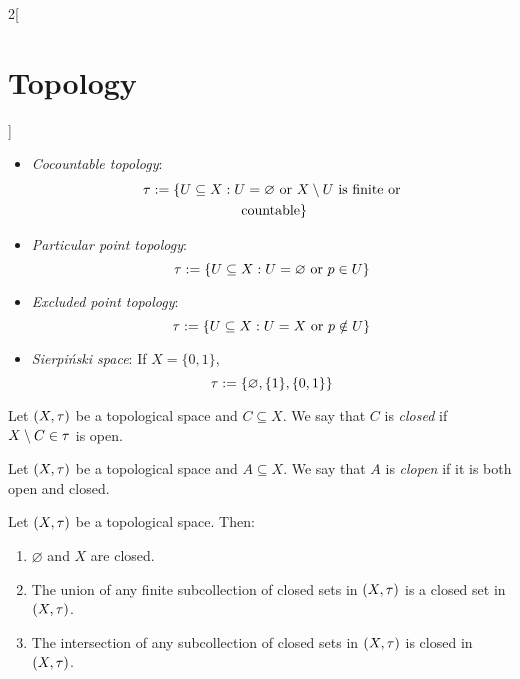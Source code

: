 \documentclass[../../../main.tex]{subfiles}
\begin{document}
\begin{multicols}{2}[\section{Topology}]
\begin{prop}
\begin{itemize}
      \item \textit{Cocountable topology}:
            \begin{multline*}
              \tau:=\{U\subseteq X:U=\varnothing\text{ or }X\setminus U\text{ is finite or}\\\text{ countable}\}
            \end{multline*}
      \item \textit{Particular point topology}: $$\tau:=\{U\subseteq X:U=\varnothing\text{ or }p\in U\}$$
      \item \textit{Excluded point topology}: $$\tau:=\{U\subseteq X:U=X\text{ or }p\notin U\}$$
      \item \textit{Sierpiński space}: If $X=\{0,1\}$, $$\tau:=\{\varnothing,\{1\},\{0,1\}\}$$
    \end{itemize}
  \end{prop}
  \begin{definition}
    Let $(X,\tau)$ be a topological space and $C\subseteq X$. We say that $C$ is \textit{closed} if $X\setminus C\in\tau$ is open.
  \end{definition}
  \begin{definition}
    Let $(X,\tau)$ be a topological space and $A\subseteq X$. We say that $A$ is \textit{clopen} if it is both open and closed.
  \end{definition}
  \begin{prop}
    Let $(X,\tau)$ be a topological space. Then:
    \begin{enumerate}
      \item $\varnothing$ and $X$ are closed.
      \item The union of any finite subcollection of closed sets in $(X,\tau)$ is a closed set in $(X,\tau)$.
      \item The intersection of any subcollection of closed sets in $(X,\tau)$ is closed in $(X,\tau)$.
    \end{enumerate}
  \end{prop}

\end{multicols}
\end{document}
